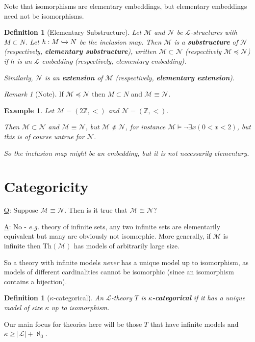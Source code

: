 \documentclass[]{article}
\theoremstyle{custhm}
\theoremstyle{cusdef}
\newtheorem{defin}[theorem]{Definition}
\theoremstyle{custhm}
\theoremstyle{custhm}
\theoremstyle{custhm}
\theoremstyle{ex}
\newtheorem{ex}[theorem]{Example}
\theoremstyle{custhm}
\theoremstyle{cusdef}
\theoremstyle{remark}
\newtheorem*{remark*}{Remark}
\newcommand{\Z}{\mathbb{Z}}
\newcommand{\undf}[1]{\textit{\textbf{#1}}}
\renewcommand{\L}{\mathcal{L}}
\renewcommand{\it}[1]{\textit{#1}}
\newcommand{\M}{\mathcal{M}}
\newcommand{\N}{\mathcal{N}}
\begin{document}
Note that isomorphisms are elementary embeddings, but elementary embeddings need not be isomorphisms.

\begin{defin}[Elementary Substructure]
Let $\M$ and $\N$ be $\L$-structures with $M\subset N$. Let $h:M \xhookrightarrow{} N$ be the inclusion map. Then $\M$ is a \undf{substructure} of $\N$ (respectively, \undf{elementary substructure}), written $\M\subset \N$ (respectively $\M\preceq\N$) if $h$ is an $\L$-embedding (respectively, elementary embedding).

Similarly, $\N$ is an \undf{extension} of $\M$ (respectively, \undf{elementary extension}).
\end{defin}	

\begin{remark*}[Note]
If $\M\preceq\N$ then $M\subset N$ and $\M\equiv \N$.
\end{remark*}
\begin{ex}
Let $\M = (2\Z, <)$ and $\N = (\Z, <)$.

Then $\M \subset \N$ and $\M \equiv \N$, but $\M\not\preceq\N$, for instance $\M\models \neg\exists x(0 < x < 2)$, but this is of course untrue for $\N$.

So the inclusion map might be an embedding, but it is not necessarily elementary.
\end{ex}


\section{Categoricity}

\underline{Q}: Suppose $\M\equiv\N$. Then is it true that $\M \cong \N$?

\underline{A}: No - \it{e.g.} theory of infinite sets, any two infinite sets are elementarily equivalent but many are obviously not isomorphic. More generally, if $\M$ is infinite then Th$(\M)$ has models of arbitrarily large size.

So a theory with infinite models \it{never} has a unique model up to isomorphism, as models of different cardinalities cannot be isomorphic (since an isomorphism contains a bijection).

\begin{defin}[$\kappa$-categorical]
An $\L$-theory $T$ is \undf{$\kappa$-categorical} if it has a unique model of size $\kappa$ up to isomorphism.
\end{defin}
Our main focus for theories here will be those $T$ that have infinite models and $\kappa \ge |\L| + \aleph_0$.
\end{document}
